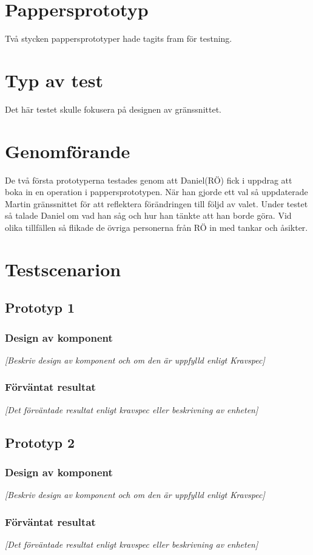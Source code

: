 \documentclass[a4paper,10pt, twoside]{article}
\begin{document}
\section{Pappersprototyp}
Två stycken pappersprototyper hade tagits fram för testning.
\section{Typ av test}
Det här testet skulle fokusera på designen av gränssnittet.
\section{Genomförande}
De två första prototyperna testades genom att Daniel(RÖ) fick i uppdrag att boka in en operation i pappersprototypen. När han gjorde ett val så uppdaterade Martin gränssnittet för att reflektera förändringen till följd av valet. Under testet så talade Daniel om vad han såg och hur han tänkte att han borde göra. Vid olika tillfällen så flikade de övriga personerna från RÖ in med tankar och åsikter.
\section{Testscenarion}

\subsection{Prototyp 1}
\subsubsection{Design av komponent}
\emph{[Beskriv design av komponent och om den är uppfylld enligt Kravspec]}
\subsubsection{Förväntat resultat}
\emph{[Det förväntade resultat enligt kravspec eller beskrivning av enheten]}
\subsection{Prototyp 2}
\subsubsection{Design av komponent}
\emph{[Beskriv design av komponent och om den är uppfylld enligt Kravspec]}
\subsubsection{Förväntat resultat}
\emph{[Det förväntade resultat enligt kravspec eller beskrivning av enheten]}
\end{document}
